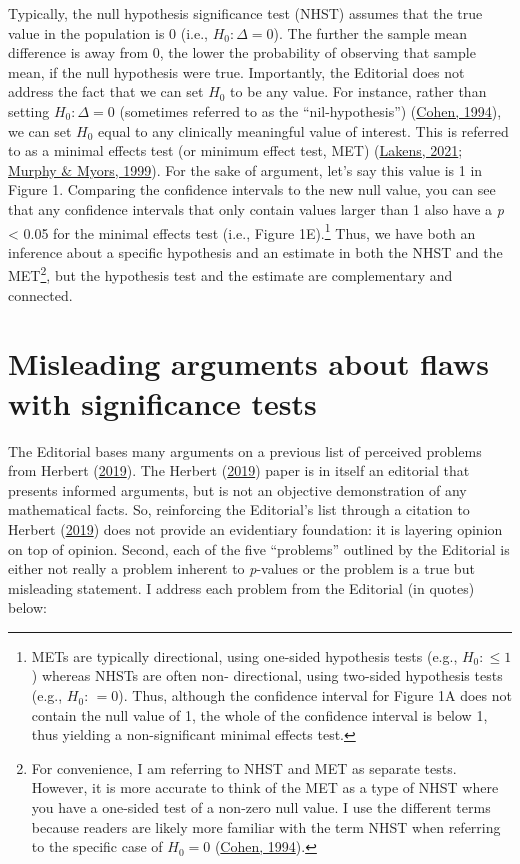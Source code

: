 \documentclass[]{cik}%
\begin{document}
Typically, the null hypothesis significance test (NHST) assumes that the
true value in the population is 0 (i.e., \(H_{0}:\Delta = 0\)). The
further the sample mean difference is away from 0, the lower the
probability of observing that sample mean, if the null hypothesis were
true. Importantly, the Editorial does not address the fact that we can
set \(H_{0}\) to be any value. For instance, rather than setting
\(H_{0}:\Delta = 0\) (sometimes referred to as the ``nil-hypothesis'')
(\protect\hyperlink{ref-4}{Cohen, 1994}), we can set \(H_{0}\) equal to
any clinically meaningful value of interest. This is referred to as a
minimal effects test (or minimum effect test, MET)
(\protect\hyperlink{ref-5}{Lakens, 2021};
\protect\hyperlink{ref-2}{Murphy \& Myors, 1999}). For the sake of
argument, let's say this value is 1 in Figure 1. Comparing the
confidence intervals to the new null value, you can see that any
confidence intervals that only contain values larger than 1 also have a
\emph{p} \textless{} 0.05 for the minimal effects test (i.e., Figure
1E).\footnote{METs are typically directional, using one-sided hypothesis
  tests (e.g., \(H_{0}: \leq 1\)) whereas NHSTs are often non-
  directional, using two-sided hypothesis tests (e.g.,
  \(H_{0}: \,= 0\)). Thus, although the confidence interval for Figure
  1A does not contain the null value of 1, the whole of the confidence
  interval is below 1, thus yielding a non-significant minimal effects
  test.} Thus, we have both an inference about a specific hypothesis and
an estimate in both the NHST and the MET\footnote{For convenience, I am
  referring to NHST and MET as separate tests. However, it is more
  accurate to think of the MET as a type of NHST where you have a
  one-sided test of a non-zero null value. I use the different terms
  because readers are likely more familiar with the term NHST when
  referring to the specific case of \(H_{0} = 0\)
  (\protect\hyperlink{ref-4}{Cohen, 1994}).}, but the hypothesis test
and the estimate are complementary and connected.

\hypertarget{misleading-arguments-about-flaws-with-significance-tests}{%
\section{Misleading arguments about flaws with significance
tests}\label{misleading-arguments-about-flaws-with-significance-tests}}

The Editorial bases many arguments on a previous list of perceived
problems from Herbert (\protect\hyperlink{ref-6}{2019}). The Herbert
(\protect\hyperlink{ref-6}{2019}) paper is in itself an editorial that
presents informed arguments, but is not an objective demonstration of
any mathematical facts. So, reinforcing the Editorial's list through a
citation to Herbert (\protect\hyperlink{ref-6}{2019}) does not provide
an evidentiary foundation: it is layering opinion on top of opinion.
Second, each of the five ``problems'' outlined by the Editorial is
either not really a problem inherent to \emph{p}-values or the problem
is a true but misleading statement. I address each problem from the
Editorial (in quotes) below:
\end{document}
